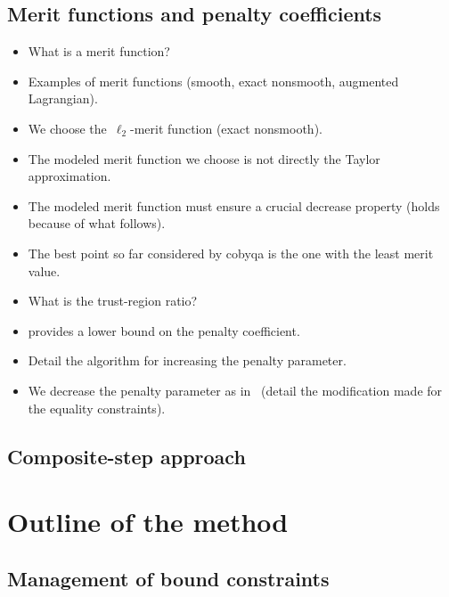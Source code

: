 \subsection{Merit functions and penalty coefficients}
\label{subsec:cobyqa-merit-function}

\begin{itemize}
    \item What is a merit function?
    \item Examples of merit functions (smooth, exact nonsmooth, augmented Lagrangian).
    \item We choose the~$\ell_2$-merit function (exact nonsmooth).
    \item The modeled merit function we choose is not directly the Taylor approximation.
    \item The modeled merit function must ensure a crucial decrease property (holds because of what follows).
    \item The best point so far considered by \gls{cobyqa} is the one with the least merit value.
    \item What is the trust-region ratio?
    \item \Cite[thm.~14.5.1]{Conn_Gould_Toint_2000} provides a lower bound on the penalty coefficient.
    \item Detail the algorithm for increasing the penalty parameter.
    \item We decrease the penalty parameter as in~\cite{Powell_1994} (detail the modification made for the equality constraints).
\end{itemize}

\subsection{Composite-step approach}

\section{Outline of the  method}

\subsection{Management of bound constraints}
\label{subsec:bound-constraints}


